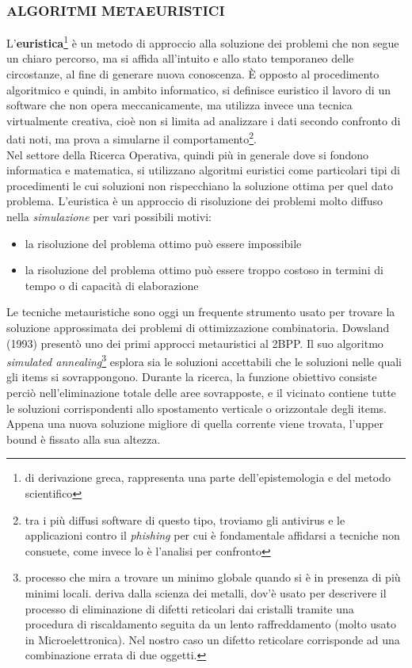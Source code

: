\documentclass[12pt,a4paper,openright,twoside]{report}
\begin{document}
\subsubsection{ALGORITMI METAEURISTICI}
L'\textbf{euristica}\footnote{di derivazione greca, rappresenta una parte dell'epistemologia e del metodo scientifico} \`{e} un metodo di approccio alla soluzione dei problemi che non segue un chiaro percorso, ma si affida all'intuito e allo stato temporaneo delle circostanze, al fine di generare nuova conoscenza. \`{E} opposto al procedimento algoritmico e quindi, in ambito informatico, si definisce euristico il lavoro di un software che non opera meccanicamente, ma utilizza invece una tecnica virtualmente creativa, cio\`{e} non si limita ad analizzare i dati secondo confronto di dati noti, ma prova a simularne il comportamento\footnote{tra i pi\`{u} diffusi software di questo tipo, troviamo gli antivirus e le applicazioni contro il \textit{phishing} per cui \`{e} fondamentale affidarsi a tecniche non consuete, come invece lo \`{e} l'analisi per confronto}.\\
Nel settore della Ricerca Operativa, quindi pi\`{u} in generale dove si fondono informatica e matematica, si utilizzano algoritmi euristici come particolari tipi di procedimenti le cui soluzioni non rispecchiano la soluzione ottima per quel dato problema. 
L'euristica \`{e} un approccio di risoluzione dei problemi molto diffuso nella \textit{simulazione} per vari possibili motivi:
\begin{itemize}
\item la risoluzione del problema ottimo pu\`{o} essere impossibile
\item la risoluzione del problema ottimo pu\`{o} essere troppo costoso in termini di tempo o di capacit\`{a} di elaborazione
\end{itemize}
Le tecniche metauristiche sono oggi un frequente strumento usato per trovare la soluzione approssimata dei problemi di ottimizzazione combinatoria. Dowsland (1993) present\`{o} uno dei primi approcci metauristici al 2BPP. Il suo algoritmo \textit{simulated annealing}\footnote{processo che mira a trovare un minimo globale quando si \`{e} in presenza di pi\`{u} minimi locali. deriva dalla scienza dei metalli, dov'\`{e} usato per descrivere il processo di eliminazione di difetti reticolari dai cristalli tramite una procedura di riscaldamento seguita da un lento raffreddamento (molto usato in Microelettronica). Nel nostro caso un difetto reticolare corrisponde ad una combinazione errata di due oggetti.} esplora sia le soluzioni accettabili che le soluzioni nelle quali gli items si sovrappongono. Durante la ricerca, la funzione obiettivo consiste perci\`{o} nell'eliminazione totale delle aree sovrapposte, e il vicinato contiene tutte le soluzioni corrispondenti allo spostamento verticale o orizzontale degli items. Appena una nuova soluzione migliore di quella corrente viene trovata, l'upper bound \`{e} fissato alla sua altezza.\\
\end{document}
